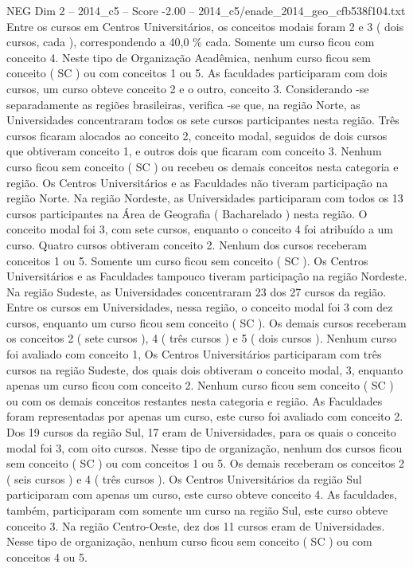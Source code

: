 \begin{textsample}{NEG Dim 2 – 2014\_c5 – Score -2.00 – 2014\_c5/enade\_2014\_geo\_cfb538f104.txt}
Entre os cursos em Centros Universitários, os conceitos modais foram 2 e 3 ( dois cursos, cada ), correspondendo a 40,0 \% cada.
Somente um curso ficou com conceito 4.
Neste tipo de Organização Acadêmica, nenhum curso ficou sem conceito ( SC ) ou com conceitos 1 ou 5.
As faculdades participaram com dois cursos, um curso obteve conceito 2 e o outro, conceito 3.
Considerando -se separadamente as regiões brasileiras, verifica -se que, na região Norte, as Universidades concentraram todos os sete cursos participantes nesta região.
Três cursos ficaram alocados ao conceito 2, conceito modal, seguidos de dois cursos que obtiveram conceito 1, e outros dois que ficaram com conceito 3.
Nenhum curso ficou sem conceito ( SC ) ou recebeu os demais conceitos nesta categoria e região.
Os Centros Universitários e as Faculdades não tiveram participação na região Norte.
Na região Nordeste, as Universidades participaram com todos os 13 cursos participantes na Área de Geografia ( Bacharelado ) nesta região.
O conceito modal foi 3, com sete cursos, enquanto o conceito 4 foi atribuído a um curso.
Quatro cursos obtiveram conceito 2.
Nenhum dos cursos receberam conceitos 1 ou 5.
Somente um curso ficou sem conceito ( SC ).
Os Centros Universitários e as Faculdades tampouco tiveram participação na região Nordeste.
Na região Sudeste, as Universidades concentraram 23 dos 27 cursos da região.
Entre os cursos em Universidades, nessa região, o conceito modal foi 3 com dez cursos, enquanto um curso ficou sem conceito ( SC ).
Os demais cursos receberam os conceitos 2 ( sete cursos ), 4 ( três cursos ) e 5 ( dois cursos ).
Nenhum curso foi avaliado com conceito 1, Os Centros Universitários participaram com três cursos na região Sudeste, dos quais dois obtiveram o conceito modal, 3, enquanto apenas um curso ficou com conceito 2.
Nenhum curso ficou sem conceito ( SC ) ou com os demais conceitos restantes nesta categoria e região.
As Faculdades foram representadas por apenas um curso, este curso foi avaliado com conceito 2.
Dos 19 cursos da região Sul, 17 eram de Universidades, para os quais o conceito modal foi 3, com oito cursos.
Nesse tipo de organização, nenhum dos cursos ficou sem conceito ( SC ) ou com conceitos 1 ou 5.
Os demais receberam os conceitos 2 ( seis cursos ) e 4 ( três cursos ).
Os Centros Universitários da região Sul participaram com apenas um curso, este curso obteve conceito 4.
As faculdades, também, participaram com somente um curso na região Sul, este curso obteve conceito 3.
Na região Centro-Oeste, dez dos 11 cursos eram de Universidades.
Nesse tipo de organização, nenhum curso ficou sem conceito ( SC ) ou com conceitos 4 ou 5.

\end{textsample}
